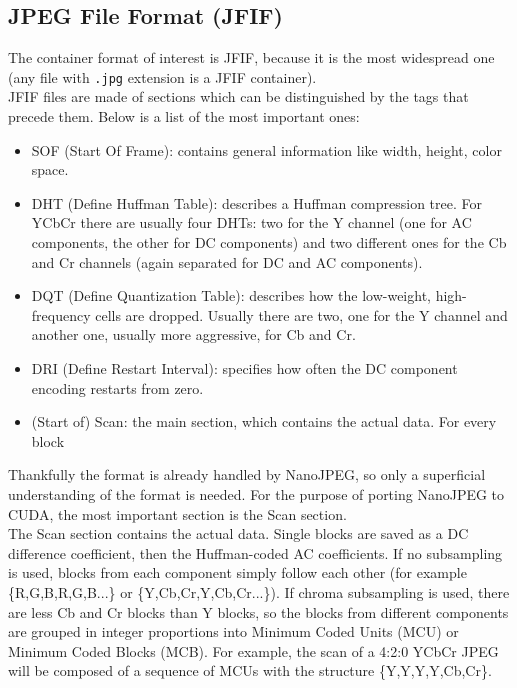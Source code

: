\subsection{JPEG File Format (JFIF)}
The container format of interest is JFIF, because it is the most widespread one (any file with \texttt{.jpg} extension is a JFIF container).\\
JFIF files are made of sections which can be distinguished by the tags that precede them. Below is a list of the most important ones:
\begin{itemize}
    \item SOF (Start Of Frame): contains general information like width, height, color space.
    \item DHT (Define Huffman Table): describes a Huffman compression tree. For YCbCr there are usually four DHTs: two for the Y channel (one for AC components, the other for DC components) and two different ones for the Cb and Cr channels (again separated for DC and AC components).
    \item DQT (Define Quantization Table): describes how the low-weight, high-frequency cells are dropped. Usually there are two, one for the Y channel and another one, usually more aggressive, for Cb and Cr.
    \item DRI (Define Restart Interval): specifies how often the DC component encoding restarts from zero.
    \item (Start of) Scan: the main section, which contains the actual data. For every block
\end{itemize}

Thankfully the format is already handled by NanoJPEG, so only a superficial understanding of the format is needed. For the purpose of porting NanoJPEG to CUDA, the most important section is the Scan section.\\
The Scan section contains the actual data. Single blocks are saved as a DC difference coefficient, then the Huffman-coded AC coefficients. If no subsampling is used, blocks from each component simply follow each other (for example \{R,G,B,R,G,B...\} or \{Y,Cb,Cr,Y,Cb,Cr...\}). If chroma subsampling is used, there are less Cb and Cr blocks than Y blocks, so the blocks from different components are grouped in integer proportions into Minimum Coded Units (MCU) or Minimum Coded Blocks (MCB). For example, the scan of a 4:2:0 YCbCr JPEG will be composed of a sequence of MCUs with the structure \{Y,Y,Y,Y,Cb,Cr\}.


